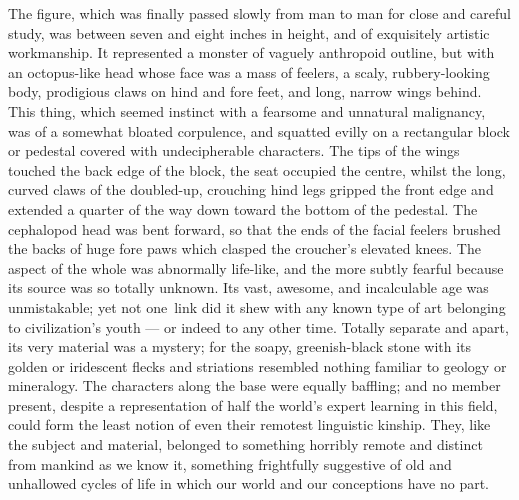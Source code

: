 The figure, which was finally passed slowly from man to man for close
and careful study, was between seven and eight inches in height, and of
exquisitely artistic workmanship. It represented a monster of vaguely
anthropoid outline, but with an octopus-like head whose face was a mass
of feelers, a scaly, rubbery-looking body, prodigious claws on hind and
fore feet, and long, narrow wings behind. This thing, which seemed
instinct with a fearsome and unnatural malignancy, was of a somewhat
bloated corpulence, and squatted evilly on a rectangular block or
pedestal covered with undecipherable characters. The tips of the wings
touched the back edge of the block, the seat occupied the centre, whilst
the long, curved claws of the doubled-up, crouching hind legs gripped
the front edge and extended a quarter of the way down toward the bottom
of the pedestal. The cephalopod head was bent forward, so that the ends
of the facial feelers brushed the backs of huge fore paws which clasped
the croucher's elevated knees. The aspect of the whole was abnormally
life-like, and the more subtly fearful because its source was so totally
unknown. Its vast, awesome, and incalculable age was unmistakable; yet
not one\est\ link did it shew with any known type of art belonging to
civilization's youth --- or indeed to any other time. Totally separate and
apart, its very material was a mystery; for the soapy, greenish-black
stone with its golden or iridescent flecks and striations resembled
nothing familiar to geology or mineralogy. The characters along the base
were equally baffling; and no member present, despite a representation
of half the world's expert learning in this field, could form the least
notion of even their remotest linguistic kinship. They, like the subject
and material, belonged to something horribly remote and distinct from
mankind as we know it, something frightfully suggestive of old and
unhallowed cycles of life in which our world and our conceptions have no
part.

